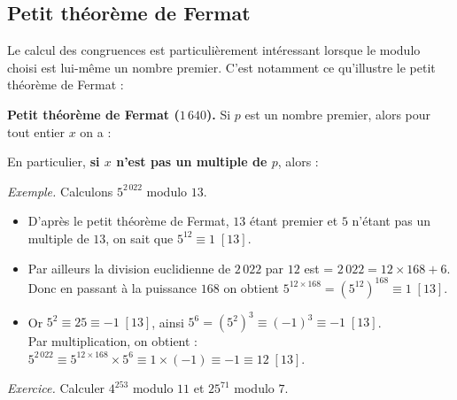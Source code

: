 \documentclass[11pt,class=report,crop=false]{standalone}
\begin{document}
\subsection*{Petit théorème de Fermat}


Le calcul des congruences est particulièrement intéressant lorsque le modulo choisi est lui-même un nombre premier. C'est notamment ce qu'illustre le petit théorème de Fermat :

\textbf{Petit théorème de Fermat ($1\,640$).}
Si $p$ est un nombre premier, alors pour tout entier $x$ on a : 

En particulier, \textbf{si $x$ n'est pas un multiple de $p$}, alors :

\medskip

\emph{Exemple.}
Calculons $5^{2\,022}$ modulo $13$.
\begin{itemize}
    \item D'après le petit théorème de Fermat, $13$ étant premier et $5$ n'étant pas un multiple de $13$, on sait que $5^{12} \equiv 1 \;[13]$.
    
    \item Par ailleurs la division euclidienne de $2\,022$ par $12$ est  = $2\,022 = 12\times 168+6$. Donc en passant à la puissance $168$ on obtient $5^{12\times 168} = (5^{12})^{168} \equiv 1 \;[13]$.
    
    \item Or $5^2\equiv25\equiv-1 \;[13]$,  ainsi $5^6 = (5^2)^3  \equiv (-1)^3  \equiv -1 \;[13]$.\\
    Par multiplication, on obtient : \quad $5^{2\,022}  \equiv 5^{12\times 168} \times 5^6  \equiv 1 \times (-1 ) \equiv -1 \equiv 12 \; [13]$.
\end{itemize}

\medskip

\emph{Exercice.} Calculer $4^{253}$ modulo $11$ et $25^{71}$ modulo $7$.
\end{document}
